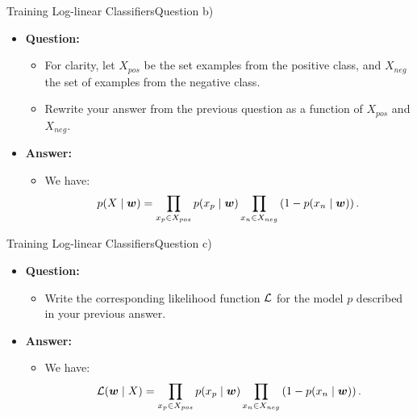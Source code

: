 \documentclass[t]{beamer}
\begin{document}
\begin{frame}{Training Log-linear Classifiers}{Question b)}
    \begin{itemize}
        \item \textbf{Question:}
              \begin{itemize}
                  \item For clarity, let $X_{pos}$ be the set examples from the
                        positive class, and $X_{neg}$ the set of examples from
                        the negative class.
                  \item Rewrite your answer from the previous question as a
                        function of $X_{pos}$ and $X_{neg}$.
              \end{itemize}
              \pause
        \item \textbf{Answer:}
              \begin{itemize}
                  \item We have:
                        \begin{align}
                            p(X\mid{\boldsymbol{w}}) = \prod_{x_p\in X_{pos}}p(x_p\mid{\boldsymbol{w}})\prod_{x_n\in X_{neg}}\left(1 - p(x_n\mid{\boldsymbol{w}})\right).
                        \end{align}
              \end{itemize}
    \end{itemize}
\end{frame}

\begin{frame}{Training Log-linear Classifiers}{Question c)}
    \begin{itemize}
        \item \textbf{Question:}
              \begin{itemize}
                  \item Write the corresponding likelihood function $\mathcal{L}$
                        for the model $p$ described in your previous answer.
              \end{itemize}
              \pause
        \item \textbf{Answer:}
              \begin{itemize}
                  \item We have:
                        \begin{align}
                            \mathcal{L}({\boldsymbol{w}}\mid X) = \prod_{x_p\in X_{pos}}p(x_p\mid{\boldsymbol{w}})\prod_{x_n\in X_{neg}}\left(1 - p(x_n\mid{\boldsymbol{w}})\right).
                        \end{align}
              \end{itemize}
    \end{itemize}
\end{frame}
\end{document}
